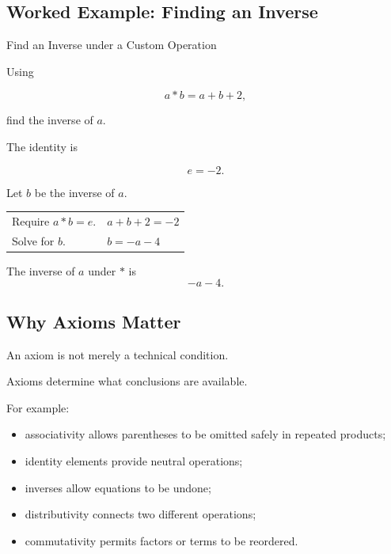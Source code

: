 \subsection{Worked Example: Finding an Inverse}
\label{subsec:worked-inverse-abstract}

\begin{workedexamplebox}{Find an Inverse under a Custom Operation}

Using

\[ a*b=a+b+2, \]

find the inverse of \(a\).

The identity is

\[ e=-2. \]

Let \(b\) be the inverse of \(a\).

\begin{tabularx}{\textwidth}{@{}>{\raggedright\arraybackslash}p{}X@{}}
Require \(a*b=e\). & \(a+b+2=-2\)\\
Solve for \(b\). & \(b=-a-4\)
\end{tabularx}

\begin{answerbox}
The inverse of \(a\) under \(*\) is
\[ -a-4. \]
\end{answerbox}
\end{workedexamplebox}

\subsection{Why Axioms Matter}
\label{subsec:why-axioms-matter}

An axiom is not merely a technical condition.

Axioms determine what conclusions are available.

For example:

\begin{itemize}
    \item associativity allows parentheses to be omitted safely in repeated products;
    \item identity elements provide neutral operations;
    \item inverses allow equations to be undone;
    \item distributivity connects two different operations;
    \item commutativity permits factors or terms to be reordered.
\end{itemize}


